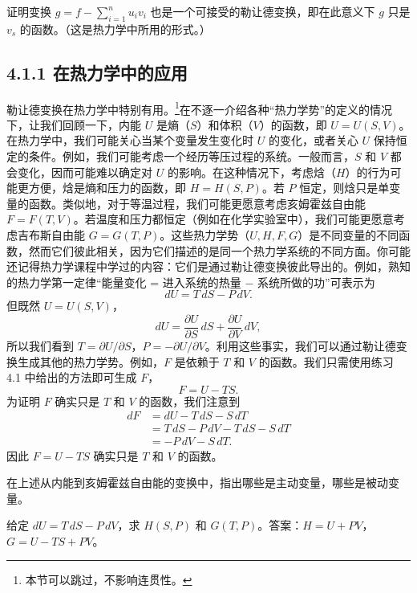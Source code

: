 \begin{exercise}
证明变换 $g = f - \sum_{i=1}^{n} u_i v_i$ 也是一个可接受的勒让德变换，即在此意义下 $g$ 只是 $v_s$ 的函数。（这是热力学中所用的形式。）
\end{exercise}

\subsection*{4.1.1  在热力学中的应用}

勒让德变换在热力学中特别有用。\footnote{本节可以跳过，不影响连贯性。}在不逐一介绍各种“热力学势”的定义的情况下，让我们回顾一下，内能 $U$ 是熵（$S$）和体积（$V$）的函数，即 $U = U(S, V)$。在热力学中，我们可能关心当某个变量发生变化时 $U$ 的变化，或者关心 $U$ 保持恒定的条件。例如，我们可能考虑一个经历等压过程的系统。一般而言，$S$ 和 $V$ 都会变化，因而可能难以确定对 $U$ 的影响。在这种情况下，考虑焓（$H$）的行为可能更方便，焓是熵和压力的函数，即 $H = H(S, P)$。若 $P$ 恒定，则焓只是单变量的函数。类似地，对于等温过程，我们可能更愿意考虑亥姆霍兹自由能 $F = F(T, V)$。若温度和压力都恒定（例如在化学实验室中），我们可能更愿意考虑吉布斯自由能 $G = G(T, P)$。这些热力学势（$U, H, F, G$）是不同变量的不同函数，然而它们彼此相关，因为它们描述的是同一个热力学系统的不同方面。你可能还记得热力学课程中学过的内容：它们是通过勒让德变换彼此导出的。例如，熟知的热力学第一定律“能量变化 = 进入系统的热量 $-$ 系统所做的功”可表示为
$$
dU = T\,dS - P\,dV .
$$
但既然 $U = U(S, V)$，
$$
dU = \frac{\partial U}{\partial S}\,dS + \frac{\partial U}{\partial V}\,dV,
$$
所以我们看到 $T = \partial U/\partial S$，$P = -\partial U/\partial V$。利用这些事实，我们可以通过勒让德变换生成其他的热力学势。例如，$F$ 是依赖于 $T$ 和 $V$ 的函数。我们只需使用练习 4.1 中给出的方法即可生成 $F$，
$$
F = U - TS .
$$
为证明 $F$ 确实只是 $T$ 和 $V$ 的函数，我们注意到
$$
\begin{aligned}
dF &= dU - T\,dS - S\,dT\\
&= T\,dS - P\,dV - T\,dS - S\,dT\\
&= -P\,dV - S\,dT .
\end{aligned}
$$
因此 $F = U - TS$ 确实只是 $T$ 和 $V$ 的函数。

\begin{exercise}
在上述从内能到亥姆霍兹自由能的变换中，指出哪些是主动变量，哪些是被动变量。
\end{exercise}

\begin{exercise}
给定 $dU = T\,dS - P\,dV$，求 $H(S, P)$ 和 $G(T, P)$。答案：$H = U + PV$，$G = U - TS + PV$。
\end{exercise}

